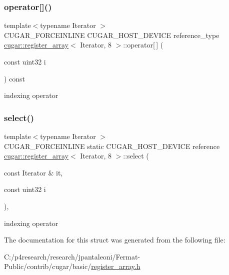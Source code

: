 \subsubsection{\texorpdfstring{operator[]()}{operator[]()}}
{\footnotesize\ttfamily template$<$typename Iterator $>$ \\
C\+U\+G\+A\+R\+\_\+\+F\+O\+R\+C\+E\+I\+N\+L\+I\+NE C\+U\+G\+A\+R\+\_\+\+H\+O\+S\+T\+\_\+\+D\+E\+V\+I\+CE reference\+\_\+type \hyperlink{structcugar_1_1register__array}{cugar\+::register\+\_\+array}$<$ Iterator, 8 $>$\+::operator\mbox{[}$\,$\mbox{]} (\begin{DoxyParamCaption}\item[{const uint32}]{i }\end{DoxyParamCaption}) const\hspace{0.3cm}{\ttfamily [inline]}}

indexing operator \mbox{\label{structcugar_1_1register__array_3_01_iterator_00_018_01_4_a464fe0fe689929cb08afccc3acf90d78}} 
\subsubsection{\texorpdfstring{select()}{select()}}
{\footnotesize\ttfamily template$<$typename Iterator $>$ \\
C\+U\+G\+A\+R\+\_\+\+F\+O\+R\+C\+E\+I\+N\+L\+I\+NE static C\+U\+G\+A\+R\+\_\+\+H\+O\+S\+T\+\_\+\+D\+E\+V\+I\+CE reference \hyperlink{structcugar_1_1register__array}{cugar\+::register\+\_\+array}$<$ Iterator, 8 $>$\+::select (\begin{DoxyParamCaption}\item[{const Iterator \&}]{it,  }\item[{const uint32}]{i }\end{DoxyParamCaption})\hspace{0.3cm}{\ttfamily [inline]}, {\ttfamily [static]}}

indexing operator 

The documentation for this struct was generated from the following file\+:\begin{DoxyCompactItemize}
\item 
C\+:/p4research/research/jpantaleoni/\+Fermat-\/\+Public/contrib/cugar/basic/\hyperlink{register__array_8h}{register\+\_\+array.\+h}\end{DoxyCompactItemize}
